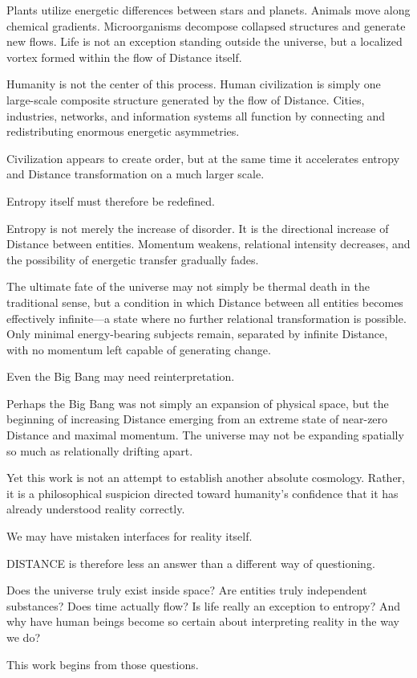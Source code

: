 \documentclass[11pt]{article}
\begin{document}
Plants utilize energetic differences between stars and planets. Animals move along chemical gradients. Microorganisms decompose collapsed structures and generate new flows. Life is not an exception standing outside the universe, but a localized vortex formed within the flow of Distance itself.

Humanity is not the center of this process. Human civilization is simply one large-scale composite structure generated by the flow of Distance. Cities, industries, networks, and information systems all function by connecting and redistributing enormous energetic asymmetries.

Civilization appears to create order, but at the same time it accelerates entropy and Distance transformation on a much larger scale.

Entropy itself must therefore be redefined.

Entropy is not merely the increase of disorder. It is the directional increase of Distance between entities. Momentum weakens, relational intensity decreases, and the possibility of energetic transfer gradually fades.

The ultimate fate of the universe may not simply be thermal death in the traditional sense, but a condition in which Distance between all entities becomes effectively infinite---a state where no further relational transformation is possible. Only minimal energy-bearing subjects remain, separated by infinite Distance, with no momentum left capable of generating change.

Even the Big Bang may need reinterpretation.

Perhaps the Big Bang was not simply an expansion of physical space, but the beginning of increasing Distance emerging from an extreme state of near-zero Distance and maximal momentum. The universe may not be expanding spatially so much as relationally drifting apart.

Yet this work is not an attempt to establish another absolute cosmology. Rather, it is a philosophical suspicion directed toward humanity's confidence that it has already understood reality correctly.

We may have mistaken interfaces for reality itself.

DISTANCE is therefore less an answer than a different way of questioning.

Does the universe truly exist inside space?
Are entities truly independent substances?
Does time actually flow?
Is life really an exception to entropy?
And why have human beings become so certain about interpreting reality in the way we do?

This work begins from those questions.
\end{document}
